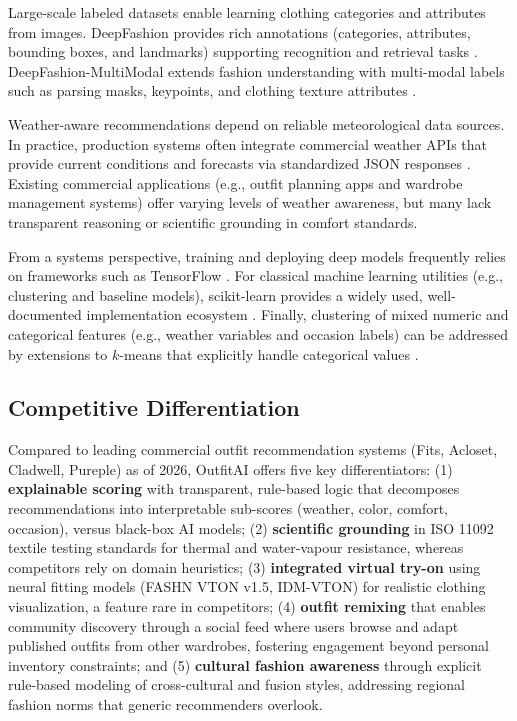 \documentclass[stu,man]{apa7}
\begin{document}
Large-scale labeled datasets enable learning clothing categories and attributes from images.
DeepFashion provides rich annotations (categories, attributes, bounding boxes, and landmarks) supporting recognition and retrieval tasks \parencite{liuLQWTcvpr16DeepFashion}.
DeepFashion-MultiModal extends fashion understanding with multi-modal labels such as parsing masks, keypoints, and clothing texture attributes \parencite{deepfashionmultimodal,jiang2022text2human}.

Weather-aware recommendations depend on reliable meteorological data sources.
In practice, production systems often integrate commercial weather APIs that provide current conditions and forecasts via standardized JSON responses \parencite{openweatherapi}.
Existing commercial applications (e.g., outfit planning apps and wardrobe management systems) offer varying levels of weather awareness, but many lack transparent reasoning or scientific grounding in comfort standards.

From a systems perspective, training and deploying deep models frequently relies on frameworks such as TensorFlow \parencite{abadi2016tensorflow}.
For classical machine learning utilities (e.g., clustering and baseline models), scikit-learn provides a widely used, well-documented implementation ecosystem \parencite{pedregosa2011scikit}.
Finally, clustering of mixed numeric and categorical features (e.g., weather variables and occasion labels) can be addressed by extensions to $k$-means that explicitly handle categorical values \parencite{huang1998extensions}.

\subsection{Competitive Differentiation}

Compared to leading commercial outfit recommendation systems (Fits, Acloset, Cladwell, Pureple) as of 2026, OutfitAI offers five key differentiators: (1) \textbf{explainable scoring} with transparent, rule-based logic that decomposes recommendations into interpretable sub-scores (weather, color, comfort, occasion), versus black-box AI models; (2) \textbf{scientific grounding} in ISO 11092 textile testing standards for thermal and water-vapour resistance, whereas competitors rely on domain heuristics; (3) \textbf{integrated virtual try-on} using neural fitting models (FASHN VTON v1.5, IDM-VTON) for realistic clothing visualization, a feature rare in competitors; (4) \textbf{outfit remixing} that enables community discovery through a social feed where users browse and adapt published outfits from other wardrobes, fostering engagement beyond personal inventory constraints; and (5) \textbf{cultural fashion awareness} through explicit rule-based modeling of cross-cultural and fusion styles, addressing regional fashion norms that generic recommenders overlook.
\end{document}
